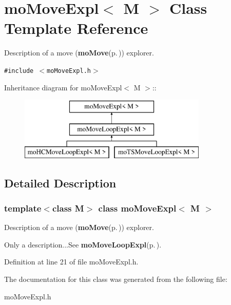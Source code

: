 \section{mo\-Move\-Expl$<$ M $>$ Class Template Reference}
\label{classmo_move_expl}
Description of a move ({\bf mo\-Move}{\rm (p.\,\pageref{classmo_move})}) explorer.  


{\tt \#include $<$mo\-Move\-Expl.h$>$}

Inheritance diagram for mo\-Move\-Expl$<$ M $>$::\begin{figure}[H]
\begin{center}
\leavevmode
\includegraphics[height=3cm]{classmo_move_expl}
\end{center}
\end{figure}


\subsection{Detailed Description}
\subsubsection*{template$<$class M$>$ class mo\-Move\-Expl$<$ M $>$}

Description of a move ({\bf mo\-Move}{\rm (p.\,\pageref{classmo_move})}) explorer. 

Only a description...See {\bf mo\-Move\-Loop\-Expl}{\rm (p.\,\pageref{classmo_move_loop_expl})}. 



Definition at line 21 of file mo\-Move\-Expl.h.

The documentation for this class was generated from the following file:\begin{CompactItemize}
\item 
mo\-Move\-Expl.h\end{CompactItemize}
